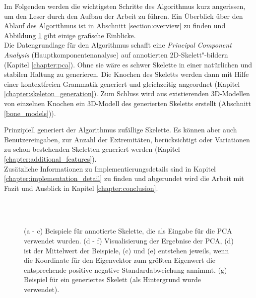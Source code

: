 Im Folgenden werden die wichtigsten Schritte des Algorithmus kurz angerissen, um den Leser durch den Aufbau der Arbeit zu führen. Ein Überblick über den Ablauf des Algorithmus ist in Abschnitt \ref{section:overview} zu finden und Abbildung \ref{intro_pic} gibt einige grafische Einblicke.\\
Die Datengrundlage für den Algorithmus schafft eine \emph{Principal Component Analysis} (Hauptkomponentenanalyse) auf annotierten 2D-Skelett"-bildern (Kapitel \ref{chapter:pca}). Ohne sie wäre es schwer Skelette in einer natürlichen und stabilen Haltung zu generieren.
Die Knochen des Skeletts werden dann mit Hilfe einer kontextfreien Grammatik generiert und gleichzeitig angeordnet (Kapitel \ref{chapter:skeleton_generation}). 
Zum Schluss wird aus existierenden 3D-Modellen von einzelnen Knochen ein 3D-Modell des generierten Skeletts erstellt (Abschnitt \ref{bone_models})).

Prinzipiell generiert der Algorithmus zufällige Skelette. Es können aber auch Benutzereingaben, \zb zur Anzahl der Extremitäten, berücksichtigt oder Variationen zu schon bestehenden Skeletten generiert werden (Kapitel \ref{chapter:additional_features}). \\
Zusätzliche Informationen zu Implementierungsdetails sind in Kapitel \ref{chapter:implementation_detail} zu finden und abgerundet wird die Arbeit mit Fazit und Ausblick in Kapitel \ref{chapter:conclusion}.


 \begin{figure}
  \centering
  ~
  ~
  \\
  ~
  ~
  \\
  
  \caption{(a - c) Beispiele für annotierte Skelette, die als Eingabe für die PCA verwendet wurden. (d - f) Visualisierung der Ergebnise der PCA, (d) ist der Mittelwert der Beispiele, (c) und (e) entstehen jeweils, wenn die Koordinate für den Eigenvektor zum größten Eigenwert die entsprechende positive \bzw negative Standardabweichung annimmt. (g) Beispiel für ein generiertes Skelett (als Hintergrund wurde \cite{background} verwendet).}
  \label{intro_pic}
 \end{figure}
